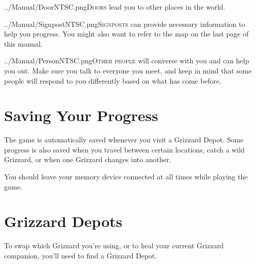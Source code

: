 \documentclass[10pt,twocolumn,openany,article]{memoir}
\newcommand\TV{NTSC}
\newcommand\TV{PAL}
\newcommand\TV{SECAM}
\begin{document}
\fi

\lettrine[image=true,                lines=5,               findent=3pt,
nindent=3pt]{../Manual/Door\TV.png}{Doors} lead  you to other  places in
the world.

\vspace{16pt}

\lettrine[image=true,                lines=5,               findent=3pt,
nindent=3pt]{../Manual/Signpost\TV.png}{Signposts} can provide necessary
information to  help you progress. You  might also want to  refer to the
map on the last page of this manual.


\lettrine[image=true,                lines=5,               findent=3pt,
nindent=3pt]{../Manual/Person\TV.png}{Other  people} will  converse with
you and can help  you out. Make sure you talk to  everyone you meet, and
keep in mind  that some people will respond to  you differently based on
what has come before.



\ifdefined\NOSAVE\else

\section{Saving Your Progress}

The game  is automatically  saved whenever you  visit a  Grizzard Depot.
Some progress is  also saved when you travel  between certain locations,
catch a wild Grizzard, or when one Grizzard changes into another.

\ifdefined\ATARIAGESAVE\else

You should leave your memory device connected at all times while playing
the game.

\fi \fi

\section{Grizzard Depots}\label{sec:GrizzardDepot}

To \ifdefined\NOSAVE\else  swap which  Grizzard you're using,  or to  \fi heal
your current Grizzard companion, you'll need to find a Grizzard Depot.
\end{document}
